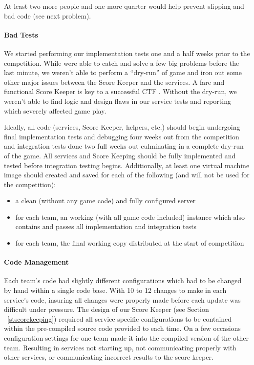 \documentclass[10pt]{article}
\begin{document}
At least two more people and one more quarter would help prevent slipping and
bad code (see next problem).

\paragraph*{Bad Tests} We started performing our implementation tests one and a
half weeks prior to the competition. While were able to catch and solve a few
big problems before the last minute, we weren't able to perform a ``dry-run'' of
game and iron out some other major issues between the Score Keeper and the
services. A fare and functional Score Keeper is key to a successful CTF
\cite{BlackHat2004}. Without the dry-run, we weren't able to find logic and
design flaws in our service tests and reporting which severely affected game
play.

Ideally, all code (services, Score Keeper, helpers, etc.) should begin
undergoing final implementation tests and debugging four weeks out from the
competition and integration tests done two full weeks out culminating in a
complete dry-run of the game. All services and Score Keeping should be fully
implemented and tested before integration testing begins. Additionally, at least
one virtual machine image should created and saved for each of the following
(and will not be used for the competition):

\begin{itemize}
  \item a clean (without any game code) and fully configured server
  \item for each team, an working (with all game code included) instance which
  also contains and passes all implementation and integration tests
  \item for each team, the final working copy distributed at the start of
  competition
\end{itemize}

\paragraph*{Code Management} Each team's code had slightly different
configurations which had to be changed by hand within a single code base. With
10 to 12 changes to make in each service's code, insuring all changes were
properly made before each update was difficult under pressure. The design of
our Score Keeper (see Section ~\ref{stscorekeeping}) required all service
specific configurations to be contained within the pre-compiled source code
provided to each time. On a few occasions configuration settings for one team
made it into the compiled version of the other team. Resulting in services not
starting up, not communicating properly with other services, or communicating
incorrect results to the score keeper.
\end{document}
